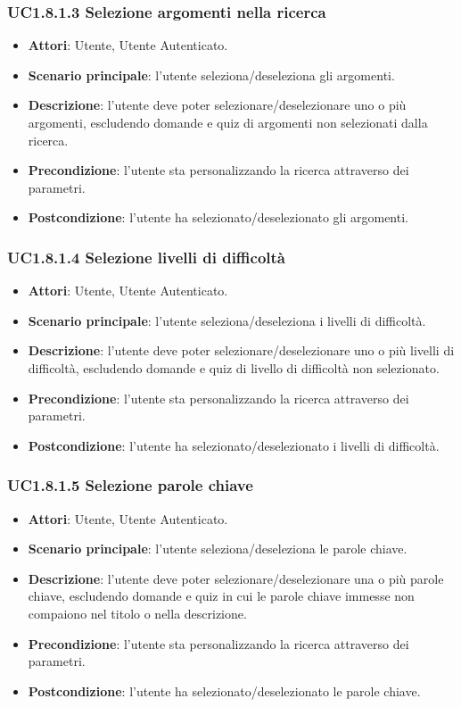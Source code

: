 \subsubsection{UC1.8.1.3 Selezione argomenti nella ricerca}
\begin{itemize}
\item \textbf{Attori}: Utente, Utente Autenticato.
\item \textbf{Scenario principale}: l'utente seleziona/deseleziona gli argomenti.
\item \textbf{Descrizione}: l'utente deve poter selezionare/deselezionare uno o più argomenti, escludendo domande e quiz di argomenti non selezionati dalla ricerca.
\item \textbf{Precondizione}: l'utente sta personalizzando la ricerca attraverso dei parametri.
\item \textbf{Postcondizione}: l'utente ha selezionato/deselezionato gli argomenti.
\end{itemize}
\subsubsection{UC1.8.1.4 Selezione livelli di difficoltà}
\begin{itemize}
\item \textbf{Attori}: Utente, Utente Autenticato.
\item \textbf{Scenario principale}: l'utente seleziona/deseleziona i livelli di difficoltà.
\item \textbf{Descrizione}: l'utente deve poter selezionare/deselezionare uno o più livelli di difficoltà, escludendo domande e quiz di livello di difficoltà non selezionato.
\item \textbf{Precondizione}: l'utente sta personalizzando la ricerca attraverso dei parametri.
\item \textbf{Postcondizione}: l'utente ha selezionato/deselezionato i livelli di difficoltà.
\end{itemize}
\subsubsection{UC1.8.1.5 Selezione parole chiave}
\begin{itemize}
\item \textbf{Attori}: Utente, Utente Autenticato.
\item \textbf{Scenario principale}: l'utente seleziona/deseleziona le parole chiave.
\item \textbf{Descrizione}: l'utente deve poter selezionare/deselezionare una o più parole chiave, escludendo domande e quiz in cui le parole chiave immesse non compaiono nel titolo o nella descrizione.
\item \textbf{Precondizione}: l'utente sta personalizzando la ricerca attraverso dei parametri.
\item \textbf{Postcondizione}: l'utente ha selezionato/deselezionato le parole chiave.
\end{itemize}
